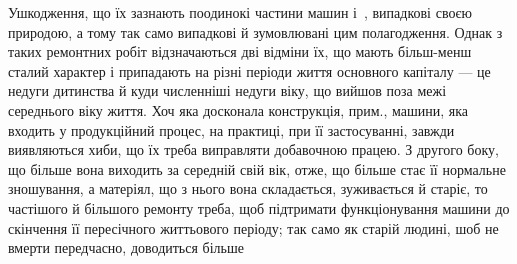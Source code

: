Ушкодження, що їх зазнають поодинокі частини машин і~, випадкові своєю природою, а тому так
само випадкові й зумовлювані цим полагодження. Однак з таких ремонтних робіт відзначаються дві
відміни їх, що мають більш-менш сталий характер і припадають на різні періоди життя основного
капіталу — це недуги дитинства й куди численніші недуги віку, що вийшов поза межі середнього віку
життя. Хоч яка досконала конструкція, прим., машини, яка входить у продукційний процес, на практиці,
при її застосуванні, завжди виявляються хиби, що їх треба виправляти добавочною працею. З другого
боку, що більше вона виходить за середній свій вік, отже, що більше стає її нормальне зношування, а
матеріял, що з нього вона складається, зуживається й старіє, то частішого й більшого ремонту треба,
щоб підтримати функціонування машини до скінчення її пересічного життьового періоду; так само як
старій людині, шоб не вмерти передчасно, доводиться більше
\parbreak{}  %
